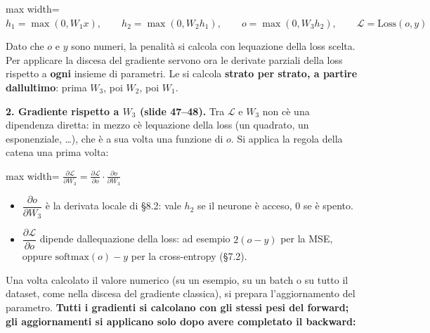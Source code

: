 \documentclass[11pt,a4paper,oneside,openany]{book}
\providecommand{\tightlist}{\setlength{\itemsep}{0pt}\setlength{\parskip}{0pt}}
\begin{document}
\begin{center}
\begin{adjustbox}{max width=\linewidth}
$\displaystyle 
h_1 = \max(0, W_1x),\qquad h_2 = \max(0, W_2h_1),\qquad o = \max(0, W_3h_2),\qquad \mathcal{L} = \text{Loss}(o, y)
$
\end{adjustbox}
\end{center}

Dato che \(o\) e \(y\) sono numeri, la penalità si calcola con l\textquotesingle equazione della loss scelta. Per applicare la discesa del gradiente servono ora le derivate parziali della loss rispetto a \textbf{ogni} insieme di parametri. Le si calcola \textbf{strato per strato, a partire dall\textquotesingle ultimo}: prima \(W_3\), poi \(W_2\), poi \(W_1\).

\textbf{2. Gradiente rispetto a \(W_3\) (slide 47--48).} Tra \(\mathcal{L}\) e \(W_3\) non c\textquotesingle è una dipendenza diretta: in mezzo c\textquotesingle è l\textquotesingle equazione della loss (un quadrato, un esponenziale, \ldots), che è a sua volta una funzione di \(o\). Si applica la regola della catena una prima volta:

\begin{center}
\begin{adjustbox}{max width=\linewidth}
$\displaystyle 
\boxed{\frac{\partial\mathcal{L}}{\partial W_3} = \frac{\partial\mathcal{L}}{\partial o}\cdot\frac{\partial o}{\partial W_3}}
$
\end{adjustbox}
\end{center}

\begin{itemize}
\tightlist
\item
  \(\dfrac{\partial o}{\partial W_3}\) è la derivata locale di §8.2: vale \(h_2\) se il neurone è acceso, \(0\) se è spento.
\item
  \(\dfrac{\partial\mathcal{L}}{\partial o}\) dipende dall\textquotesingle equazione della loss: ad esempio \(2(o-y)\) per la MSE, oppure \(\text{softmax}(o) - y\) per la cross-entropy (§7.2).
\end{itemize}

Una volta calcolato il valore numerico (su un esempio, su un batch o su tutto il dataset, come nella discesa del gradiente classica), si prepara l'aggiornamento del parametro. \textbf{Tutti i gradienti si calcolano con gli stessi pesi del forward; gli aggiornamenti si applicano solo dopo avere completato il backward:}
\end{document}
